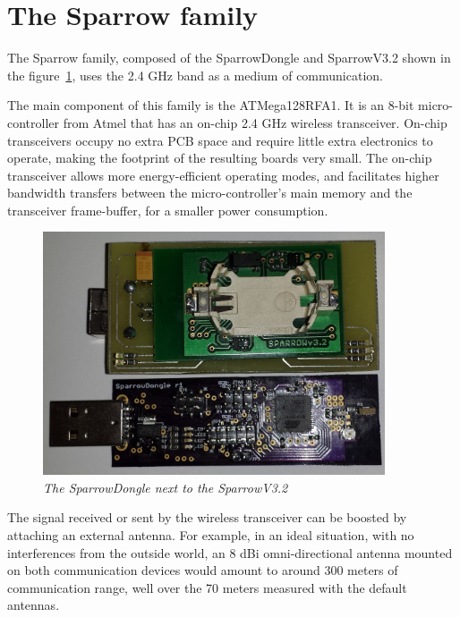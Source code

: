 \section{The Sparrow family}

The Sparrow family, composed of the SparrowDongle and SparrowV3.2 shown in the figure~\ref{fig:sparrowfamily}, uses the 2.4 GHz band as a medium of communication. 
 

The main component of this family is the ATMega128RFA1. It is an 8-bit micro-controller from Atmel that has an on-chip 2.4 GHz wireless transceiver. On-chip transceivers occupy no extra PCB space and require little extra electronics to operate, making the footprint of the resulting boards very small. The on-chip transceiver allows more energy-efficient operating modes, and facilitates higher bandwidth transfers between the micro-controller's main memory and the transceiver frame-buffer, for a smaller power consumption.

\begin{figure}[ht]
\begin{center}
\includegraphics[width=0.9\textwidth]{img/sparrow.jpg}
\end{center}
\caption{\small \itshape{The SparrowDongle next to the SparrowV3.2}}
  \label{fig:sparrowfamily}
\end{figure}

The signal received or sent by the wireless transceiver can be boosted by attaching an external antenna. For example, in an ideal situation, with no interferences from the outside world, an 8 dBi omni-directional antenna mounted on both communication devices would amount to around 300 meters of communication range, well over the 70 meters measured with the default antennas.

